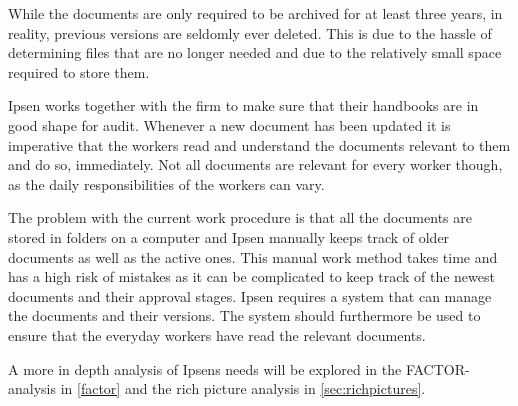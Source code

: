 While the documents are only required to be archived for at least three years, in reality, previous versions are seldomly ever deleted.
This is due to the hassle of determining files that are no longer needed and due to the relatively small space required to store them.

Ipsen works together with the firm to make sure that their handbooks are in good shape for audit.
Whenever a new document has been updated it is imperative that the workers read and understand the documents relevant to them and do so, immediately.
Not all documents are relevant for every worker though, as the daily responsibilities of the workers can vary.

The problem with the current work procedure is that all the documents are stored in folders on a computer and Ipsen manually keeps track of older documents as well as the active ones.
This manual work method takes time and has a high risk of mistakes as it can be complicated to keep track of the newest documents and their approval stages.
Ipsen requires a system that can manage the documents and their versions.
The system should furthermore be used to ensure that the everyday workers have read the relevant documents.

A more in depth analysis of Ipsens needs will be explored in the FACTOR-analysis in \cref{factor} and the rich picture analysis in \cref{sec:richpictures}.

